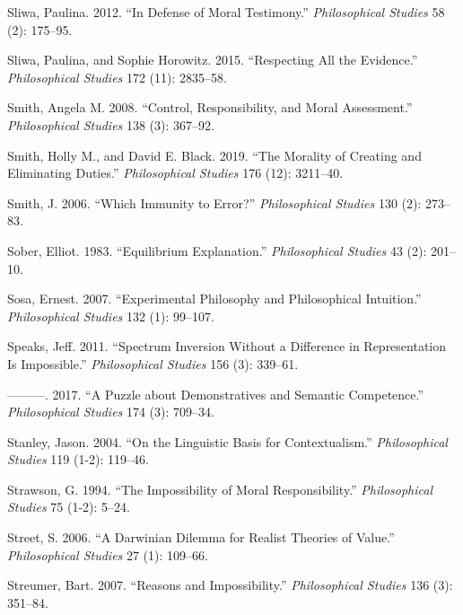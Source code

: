 \documentclass[
  10pt,
  letterpaper,
  DIV=11,
  numbers=noendperiod,
  twoside]{scrartcl}
\newlength{\cslhangindent}
\newenvironment{CSLReferences}[2] %
 {\begin{list}{}{%
  \setlength{\itemindent}{0pt}
  \setlength{\leftmargin}{0pt}
  \setlength{\parsep}{0pt}
  \ifodd #1
   \setlength{\leftmargin}{\cslhangindent}
   \setlength{\itemindent}{-1\cslhangindent}
  \fi
  \setlength{\itemsep}{#2\baselineskip}}}
 {\end{list}}
\begin{document}
\begin{CSLReferences}{1}{0}
Sliwa, Paulina. 2012. {``In Defense of Moral Testimony.''}
\emph{Philosophical Studies} 58 (2): 175--95.

Sliwa, Paulina, and Sophie Horowitz. 2015. {``Respecting All the
Evidence.''} \emph{Philosophical Studies} 172 (11): 2835--58.

Smith, Angela M. 2008. {``Control, Responsibility, and Moral
Assessment.''} \emph{Philosophical Studies} 138 (3): 367--92.

Smith, Holly M., and David E. Black. 2019. {``The Morality of Creating
and Eliminating Duties.''} \emph{Philosophical Studies} 176 (12):
3211--40.

Smith, J. 2006. {``Which Immunity to Error?''} \emph{Philosophical
Studies} 130 (2): 273--83.

Sober, Elliot. 1983. {``Equilibrium Explanation.''} \emph{Philosophical
Studies} 43 (2): 201--10.

Sosa, Ernest. 2007. {``Experimental Philosophy and Philosophical
Intuition.''} \emph{Philosophical Studies} 132 (1): 99--107.

Speaks, Jeff. 2011. {``Spectrum Inversion Without a Difference in
Representation Is Impossible.''} \emph{Philosophical Studies} 156 (3):
339--61.

---------. 2017. {``A Puzzle about Demonstratives and Semantic
Competence.''} \emph{Philosophical Studies} 174 (3): 709--34.

Stanley, Jason. 2004. {``On the Linguistic Basis for Contextualism.''}
\emph{Philosophical Studies} 119 (1-2): 119--46.

Strawson, G. 1994. {``The Impossibility of Moral Responsibility.''}
\emph{Philosophical Studies} 75 (1-2): 5--24.

Street, S. 2006. {``A Darwinian Dilemma for Realist Theories of
Value.''} \emph{Philosophical Studies} 27 (1): 109--66.

Streumer, Bart. 2007. {``Reasons and Impossibility.''}
\emph{Philosophical Studies} 136 (3): 351--84.


\end{CSLReferences}
\end{document}
